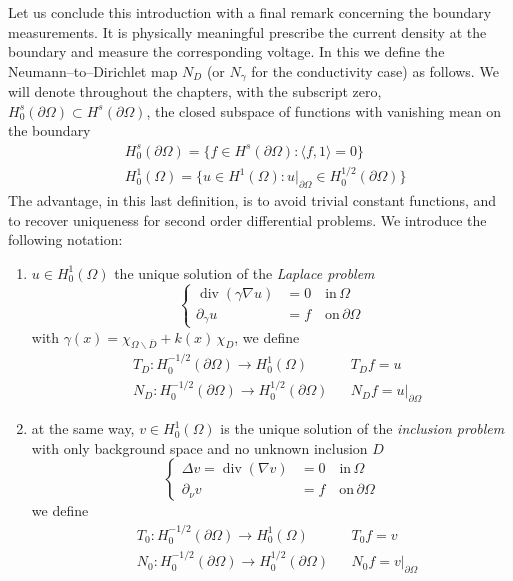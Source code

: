 \documentclass[10pt, a4paper, twoside, openright]{book}
\theoremstyle{definition}
\theoremstyle{plain}
\theoremstyle{plain}
\theoremstyle{plain}
\theoremstyle{plain}
\theoremstyle{plain}
\theoremstyle{plain}
\theoremstyle{plain}
\theoremstyle{plain}
\DeclareMathOperator{\divergence}{div}
\begin{document}
Let us conclude this introduction with a final remark concerning the boundary measurements.
It is physically meaningful prescribe the current density at the boundary and measure the corresponding voltage.
In this we define the Neumann--to--Dirichlet map $N_D$ (or $N_\gamma$ for the conductivity case) as follows.
We will denote throughout the chapters, with the subscript zero, $H^s_0(\partial\Omega)\subset H^s(\partial\Omega)$, the closed subspace of functions with vanishing mean on the boundary
\begin{align}
&H^s_0(\partial\Omega) = \Big\{ f \in H^s(\partial\Omega): \langle f,1\rangle = 0\Big\}\\
&H^1_0(\Omega) = \Big\{ u \in H^1(\Omega): u|_{\partial\Omega} \in H^{1/2}_0(\partial\Omega)\Big\}
\end{align}
The advantage, in this last definition, is to avoid trivial constant functions, and to recover uniqueness for second order differential problems.
We introduce the following notation:
\begin{enumerate}
 \item $u\in H^1_0(\Omega)$ the unique solution of the \emph{Laplace problem}
 \begin{equation}
 \label{eq:NtoD-inclusion}
  \left\{
  \begin{aligned}
  \divergence(\gamma\nabla u) &= 0 \quad\text{in}\,\Omega \\
            \partial_\gamma u &= f \quad\text{on}\,\partial \Omega
  \end{aligned}
  \right.
 \end{equation}
 with $\gamma(x) = \chi_{\Omega\backslash\overline{D}} + k(x)\,\chi_D$, we define
 \begin{align}
 &T_D: H^{-1/2}_0(\partial \Omega) \to H^1_0(\Omega) && T_Df = u \label{eq:def-T_D}\\
 &{N_D}: H^{-1/2}_0(\partial \Omega) \to H^{1/2}_0(\partial\Omega) && {N_D}f = u|_{\partial\Omega}
 \end{align}
 \item at the same way, $v\in H^1_0(\Omega)$ is the unique solution of the \emph{inclusion problem} with only background space and no unknown inclusion $D$
 \begin{equation}
 \label{eq:NtoD-laplace}
  \left\{
  \begin{aligned}
  \Delta v = \divergence(\nabla v) &= 0 \quad\text{in}\,\Omega \\
            \partial_\nu v &= f \quad\text{on}\,\partial \Omega
  \end{aligned}
  \right.
 \end{equation}
 we define
 \begin{align}
 &T_0: H^{-1/2}_0(\partial \Omega) \to H^1_0(\Omega) && T_0f = v \label{eq:def-T_0}\\
 &{N_0}: H^{-1/2}_0(\partial \Omega) \to H^{1/2}_0(\partial\Omega) && {N_0} f = v|_{\partial\Omega}
 \end{align}
\end{enumerate}
\end{document}
